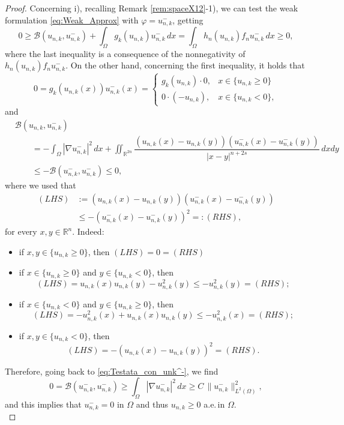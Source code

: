 \documentclass[11pt,a4paper]{amsart}
\theoremstyle{definition}
\theoremstyle{plain}
\numberwithin{equation}{section}
\begin{document}
{\begin{proof}
  Concerning i), recalling Remark \ref{rem:spaceX12}-1), we can test the weak formulation \eqref{eq:Weak_Approx} with $\varphi = u_{n,k}^{-}$, getting
\begin{equation}\label{eq:Testata_con_unk^-}
0\geq \mathcal{B}(u_{n,k}, u_{n,k}^{-}) + \int_{\Omega}g_{k}(u_{n,k})u_{n,k}^{-}\,dx = \int_{\Omega}h_{n}(u_{n,k})f_{n}u_{n,k}^{-}\,dx \geq 0,
\end{equation} 
  \noindent where the last inequality is a consequence of the nonnegativity of $h_{n}(u_{n,k})f_{n}u_{n,k}^{-}$. On the other hand, concerning the first inequality, it holds that
  \begin{equation*}
  0 = g_{k}(u_{n,k}(x))u_{n,k}^{-}(x) = \left\{ \begin{array}{rl}
  g_{k}(u_{n,k})\cdot 0, & x \in \{u_{n,k}\geq 0\}\\
  0 \cdot (-u_{n,k}),  & x \in \{u_{n,k}<0\},
  \end{array}\right.
  \end{equation*}
  \noindent and  
 \begin{equation*}
 \begin{aligned}
 & \mathcal{B}(u_{n,k}, u_{n,k}^{-}) \\
 & \qquad = -\int_{\Omega}|\nabla u_{n,k}^{-}|^2 \, dx + \iint_{\mathbb{R}^{2n}}\dfrac{(u_{n,k}(x)-u_{n,k}(y))(u_{n,k}^{-}(x)-u_{n,k}^{-}(y))}{|x-y|^{n+2s}}\,dxdy\\
 &\qquad\leq -\mathcal{B}(u_{n,k}^{-}, u_{n,k}^{-})\leq 0,
 \end{aligned}
\end{equation*}  
\noindent where we used that 
\begin{align*}
(LHS)&:= (u_{n,k}(x)-u_{n,k}(y))(u_{n,k}^{-}(x)-u_{n,k}^{-}(y)) \\
& \leq -(u_{n,k}^{-}(x)-u_{n,k}^{-}(y))^2 =: (RHS),	
\end{align*}
\noindent for every $x,y\in \mathbb{R}^{n}$. Indeed:
\begin{itemize}
\item if $x,y \in \{u_{n,k}\geq 0\}$, then $(LHS) = 0 =(RHS)$\,
\item if $x \in \{u_{n,k}\geq 0\}$ and $y \in \{u_{n,k}<0\}$, then
$$(LHS) = u_{n,k}(x)u_{n,k}(y) - u_{n,k}^{2}(y) \leq - u_{n,k}^{2}(y) =(RHS);$$
\item if $x \in \{u_{n,k}< 0\}$ and $y \in \{u_{n,k}\geq 0\}$, then
$$(LHS) = - u_{n,k}^{2}(x) + u_{n,k}(x)u_{n,k}(y)  \leq - u_{n,k}^{2}(x) =(RHS);$$
\item if $x,y \in \{u_{n,k}< 0\}$, then 
$$(LHS) = -(u_{n,k}(x)-u_{n,k}(y))^2 = (RHS).$$
\end{itemize}
  Therefore, going back to \eqref{eq:Testata_con_unk^-}, we find 
  $$0=\mathcal{B}(u_{n,k}^{-}, u_{n,k}^{-}) \geq \int_{\Omega}|\nabla u_{n,k}^{-}|^2 \, dx \geq C \, \|u_{n,k}^{-}\|^{2}_{L^{2}(\Omega)},$$
  \noindent and this implies that $u_{n,k}^{-} = 0$ in $\Omega$ and thus $u_{n,k}\geq 0$ a.e.\,in $\Omega$.\\
  

\end{proof}}
\end{document}
